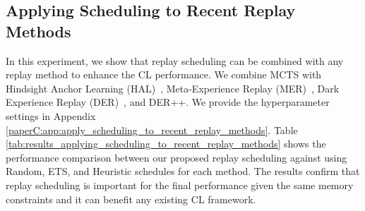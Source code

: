 %
\begin{table}[t]
	\centering
	\caption{
		Performance comparison with ACC and BWT between scheduling methods MCTS (Ours), Random, ETS, and Heuristic combined with replay-based methods HAL, MER, DER, and DER++. %
		Replay memory sizes are $M=10$ and $M=100$ for the 5-task and 10/20-task datasets respectively. We report the mean and standard deviation averaged over 5 seeds. Results on Heuristic where some seed did not converge is denoted by $^{*}$. Applying MCTS to each method can enhance the performance compared to using the baseline schedules. 
	}
	\vspace{-3mm}
	\resizebox{0.98\textwidth}{!}{ %
			
		}
		\vspace{-3mm}
		\label{tab:results_applying_scheduling_to_recent_replay_methods}
	\end{table}
	
	\subsection{Applying Scheduling to Recent Replay Methods}\label{paperC:sec:applying_scheduling_to_recent_replay_methods}
	
	In this experiment, we show that replay scheduling can be combined with any replay method to enhance the CL performance. We combine MCTS with Hindsight Anchor Learning (HAL)~, Meta-Experience Replay (MER)~, Dark Experience Replay (DER)~, and DER++. 
	We provide the hyperparameter settings in Appendix \ref{paperC:app:apply_scheduling_to_recent_replay_methods}. Table \ref{tab:results_applying_scheduling_to_recent_replay_methods} shows the performance comparison between our proposed replay scheduling against using Random, ETS, and Heuristic schedules for each method. The results confirm that replay scheduling is important for the final performance given the same memory constraints and it can benefit any existing CL framework. 


